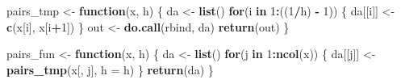 \documentclass[11pt,]{article}
\newenvironment{Shaded}{\begin{snugshade}}{\end{snugshade}}
\newcommand{\ControlFlowTok}[1]{\textcolor[rgb]{0.13,0.29,0.53}{\textbf{#1}}}
\newcommand{\DataTypeTok}[1]{\textcolor[rgb]{0.13,0.29,0.53}{#1}}
\newcommand{\DecValTok}[1]{\textcolor[rgb]{0.00,0.00,0.81}{#1}}
\newcommand{\KeywordTok}[1]{\textcolor[rgb]{0.13,0.29,0.53}{\textbf{#1}}}
\newcommand{\NormalTok}[1]{#1}
\newcommand{\OperatorTok}[1]{\textcolor[rgb]{0.81,0.36,0.00}{\textbf{#1}}}
\newcommand{\StringTok}[1]{\textcolor[rgb]{0.31,0.60,0.02}{#1}}
\begin{document}
\begin{Shaded}
\begin{Highlighting}[]
{{{{{{\NormalTok{pairs_tmp <-}\StringTok{ }\ControlFlowTok{function}\NormalTok{(x, h) \{}
\NormalTok{  da <-}\StringTok{ }\KeywordTok{list}\NormalTok{()}
  \ControlFlowTok{for}\NormalTok{(i }\ControlFlowTok{in} \DecValTok{1}\OperatorTok{:}\NormalTok{((}\DecValTok{1}\OperatorTok{/}\NormalTok{h) }\OperatorTok{-}\StringTok{ }\DecValTok{1}\NormalTok{)) \{}
\NormalTok{    da[[i]] <-}\StringTok{ }\KeywordTok{c}\NormalTok{(x[i], x[i}\OperatorTok{+}\DecValTok{1}\NormalTok{])}
\NormalTok{  \}}
\NormalTok{  out <-}\StringTok{ }\KeywordTok{do.call}\NormalTok{(rbind, da)}
  \KeywordTok{return}\NormalTok{(out)}
\NormalTok{\}}

\NormalTok{pairs_fun <-}\StringTok{ }\ControlFlowTok{function}\NormalTok{(x, h) \{}
\NormalTok{  da <-}\StringTok{ }\KeywordTok{list}\NormalTok{()}
  \ControlFlowTok{for}\NormalTok{(j }\ControlFlowTok{in} \DecValTok{1}\OperatorTok{:}\KeywordTok{ncol}\NormalTok{(x)) \{}
\NormalTok{    da[[j]] <-}\StringTok{ }\KeywordTok{pairs_tmp}\NormalTok{(x[, j], }\DataTypeTok{h =}\NormalTok{ h)}
\NormalTok{  \}}
  \KeywordTok{return}\NormalTok{(da)}
\NormalTok{\}}

}}}}}}
\end{Highlighting}
\end{Shaded}
\end{document}
